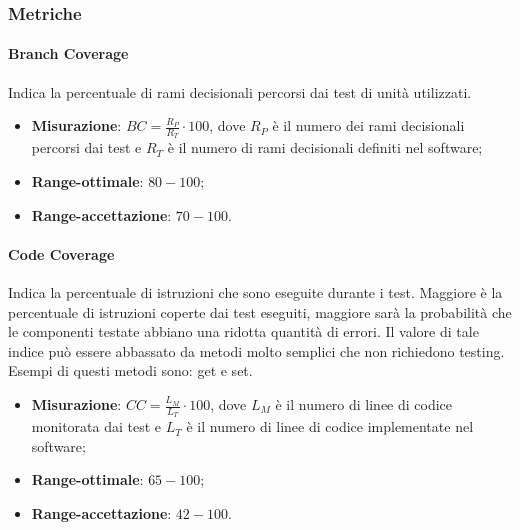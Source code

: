 \subsubsection{Metriche}
\paragraph{Branch Coverage}
Indica la percentuale di rami decisionali percorsi dai test di unità utilizzati.
\begin{itemize}
\item \textbf{Misurazione}: $BC=\frac{R_{P}}{R_{T}} \cdot 100$, dove $R_{P}$ è il numero dei rami decisionali percorsi dai test e $R_{T}$ è il numero di rami decisionali definiti nel software;
\item \textbf{Range-ottimale}: $80 - 100$;
\item \textbf{Range-accettazione}: $70 - 100$.
\end{itemize}
\paragraph{Code Coverage}
Indica la percentuale di istruzioni che sono eseguite durante i test. Maggiore è la percentuale di istruzioni coperte dai test eseguiti, maggiore sarà la probabilità che le componenti testate abbiano una ridotta quantità di errori. Il valore di tale indice può essere abbassato da metodi molto semplici che non richiedono testing. Esempi di questi metodi sono: get e set.
\begin{itemize}
\item \textbf{Misurazione}: $CC=\frac{L_{M}}{L_{T}} \cdot 100$, dove $L_{M}$ è il numero di linee di codice monitorata dai test e $L_{T}$ è il numero di linee di codice implementate nel software;
\item \textbf{Range-ottimale}: $65 - 100$;
\item \textbf{Range-accettazione}: $42 - 100$.
\end{itemize}
